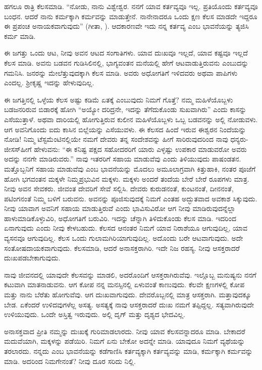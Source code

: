 ಹಗಲೂ ರಾತ್ರಿ ಕೆಲಸಮಾಡಿ. “ನೋಡು, ನಾನು ವಿಶ್ವೇಶ್ವರ. ನನಗೆ ಯಾವ ಕರ್ತವ್ಯವೂ ಇಲ್ಲ. ಪ್ರತಿಯೊಂದು ಕರ್ತವ್ಯವೂ ಬಂಧನ. ಆದರೆ ನಾನು ಕರ್ಮಕ್ಕಾಗಿ ಕರ್ಮವನ್ನು ಮಾಡುತ್ತೇನೆ. ನಾನೇನಾದರೂ ಒಂದು ಕ್ಷಣ ಕೆಲಸ ಮಾಡದೇ ಇದ್ದರೂ ಈ ಪ್ರಪಂಚ ಅನಾಯಕ\-ವಾಗುವುದು” (ಗೀತಾ, ). ಆದಕಾರಣವೇ ಇದು ನನ್ನ ಕರ್ತವ್ಯ ಎಂಬ ಭಾವನೆಯನ್ನು ತ್ಯಜಿಸಿ ಕರ್ಮ ಮಾಡಿ.

ಈ ಜಗತ್ತು ಒಂದು ಆಟ, ನೀವು ಅವನ ಆಟದ ಸಂಗಾತಿಗಳು. ಯಾವ ದುಃಖವೂ ಇಲ್ಲದೆ, ಯಾವ ಕಷ್ಟವೂ ಇಲ್ಲದೆ ಕೆಲಸ ಮಾಡಿ. ಅವನು ಬಡವನ ಗುಡಿಸಿಲಿನಲ್ಲಿ, ಭಾಗ್ಯವಂತನ ಮನೆಯಲ್ಲಿ ಹೇಗೆ ಆಟವಾಡುತ್ತಿರುವನು ಎಂಬುದನ್ನು ಗಮನಿಸಿ. ಜನರನ್ನು ಮೇಲೆತ್ತುವುದಕ್ಕಾಗಿ ಕೆಲಸ ಮಾಡಿ. ಅವರು ಅಧೋಗತಿಗೆ ಇಳಿದವರು ಅಥವಾ ಪಾಪಿಗಳು ಎಂದಲ್ಲ. ಶ‍್ರೀಕೃಷ್ಣ ಇದನ್ನು ಹೇಳುವುದಿಲ್ಲ.

ಈ ಜಗತ್ತಿನಲ್ಲಿ ಒಳ್ಳೆಯ ಕೆಲಸ ಅಷ್ಟು ಕಡಿಮೆ ಏತಕ್ಕೆ ಎಂಬುವುದು ನಿಮಗೆ ಗೊತ್ತೆ? ನಮ್ಮ ಮಹಿಳೆಯೊಬ್ಬಳು ಬಡಜನರಿರುವ ಬಿಡಾರಕ್ಕೆ ಹೋಗಿ “ಅಯ್ಯೋ ದರಿದ್ರನೇ, ಇದನ್ನು ತೆಗೆದುಕೊಂಡು ಸುಖವಾಗಿರು” ಎಂದು ಕಾಸನ್ನು ಎಸೆಯುತ್ತಾಳೆ. ಅಥವಾ ದಾರಿಯಲ್ಲಿ ಹೋಗುತ್ತಿರುವ ಕುಲೀನ ಮಹಿಳೆಯೊಬ್ಬಳು ಒಬ್ಬ ಬಡವನನ್ನು ಅಲ್ಲಿ ನೋಡುವಳು. ಆಗ ಅವನಿಗೊಂದು ಐದು ಕಾಸಿನ ಬಿಲ್ಲೆಯನ್ನು ಎಸೆಯುವಳು. ಈ ಕೆಲಸದ ಹಿಂದೆ ಇರುವ ಈಶ್ವರನ ನಿಂದೆಯನ್ನು ನೋಡಿ! ನಿಮ್ಮ ಟೆಸ್ಟಮೆಂಟಿನಲ್ಲಿಯೇ ನಮಗೆ ದೇವರು ತನ್ನ ಸಂದೇಶವನ್ನು ಹೀಗೆ ಸಾರಿರುವುದರಿಂದ ನಾವು ಧನ್ಯರು- ಜೀಸಸ್​ ಹೀಗೆ ಹೇಳುವನು: “ಈ ಕನಿಷ್ಟ ಪಕ್ಷದ ಸಹೋದರರಿಗೆ ಯಾರು ಎಳ್ಳಷ್ಟು ಉಪಕಾರ ಮಾಡುವರೋ ಅವರು ಅದನ್ನು ನನಗೇ ಮಾಡಿರುವರು.” ನಾವು ಇತರರಿಗೆ ಸಹಾಯ ಮಾಡುವೆವು ಎಂದು ತಿಳಿಯುವುದು ಪಾಷಂಡತನ. ಮತ್ತೊಬ್ಬನಿಗೆ ಸಹಾಯ ಮಾಡುವೆವು ಎಂಬ ಭಾವನೆಯನ್ನು ಮೊದಲು ಅಮೂಲಾಗ್ರವಾಗಿ ಕಿತ್ತುಹಾಕಿ, ನಂತರ ಪೂಜೆಗೆ ಹೋಗಿ ಭಗವಂತನ ಮಕ್ಕಳೇ ನಿಮ್ಮ\break ಪ್ರಭುವಿನ ಮಕ್ಕಳು. ಮಕ್ಕಳು ಅಂದರೆ ತಂದೆಯ ಬೇರೆ ಬೇರೆ ರೂಪಗಳು ಮಾತ್ರ. ನೀವು ಅವನ ಸೇವಕರು. ಜೀವಂತ ದೇವರಿಗೆ ಸೇವೆ ಸಲ್ಲಿಸಿ. ದೇವರು ಕುರುಡನಂತೆ, ಕುಂಟನಂತೆ, ದೀನನಂತೆ, ಪಟಿಂಗನಂತೆ ನಿಮ್ಮ ಬಳಿಗೆ ಬರುವನು. ಅವನನ್ನು ಪೂಜಿಸುವುದಕ್ಕೆ ನಿಮಗೆ ಎಂತಹ ಅದ್ಭುತವಾದ ಅವಕಾಶ ಸಿಕ್ಕುವುದು. ನೀವು ಯಾವಾಗ ಅವನಿಗೆ ಸಹಾಯ ಮಾಡುತ್ತಿರುವೆ ಎಂದು ಭಾವಿಸುವಿರೋ ಆಗ ನೀವು ಮಾಡಿರುವುದನ್ನೆಲ್ಲಾ ಹಾಳುಮಾಡಿಕೊಳ್ಳುವಿರಿ, ಅಧೋಗತಿಗೆ ಬರುವಿರಿ. ಇದನ್ನು ಚೆನ್ನಾಗಿ ತಿಳಿದುಕೊಂಡು ಕೆಲಸ ಮಾಡಿ. ಇದರಿಂದ ಏನಾಗುವುದು ಎಂದು ನೀವು ಕೇಳಬಹುದು. ಕೆಲಸದ ಆನಂತರ ನಿಮಗೆ ಯಾವ ನಿರಾಶೆಯೂ ಆಗುವುದಿಲ್ಲ, ಯಾವ ವ್ಯಸನವೂ ಆಗುವುದಿಲ್ಲ. ಕೆಲಸ ಒಂದು ಗುಲಾಮಗಿರಿಯಾಗುವುದಿಲ್ಲ. ಅದೊಂದು ಬರೇ ಆಟವಾಗುವುದು. ಅದೇ ಸಂತೋಷದಾಯಕವಾಗುವುದು. ಕೆಲಸಮಾಡಿ, ಆದರೆ ಅನಾಸಕ್ತರಾಗಿರಿ. ಇದೇ ನಿಜ ರಹಸ್ಯ. ನೀವು ಆಸಕ್ತರಾದರೆ ದುಃಖಪಡಬೇಕಾಗುವುದು.

ನಾವು ಜೀವನದಲ್ಲಿ ಯಾವುದೇ ಕೆಲಸವನ್ನು ಮಾಡಲಿ, ಅದರೊಂದಿಗೆ ಆಸಕ್ತರಾಗಿರು\-ವೆವು. ಇಲ್ಲೊಬ್ಬ ಮನುಷ್ಯನು ನನಗೆ ಕಟುವಾಗಿ ಮಾತನಾಡುವನು. ಆಗ ಕೋಪ ನನ್ನ ಮನಸ್ಸಿನಲ್ಲಿ ಏಳುವಂತೆ ಕಾಣುವುದು. ಕೆಲವೇ ಕ್ಷಣಗಳಲ್ಲಿ ಕೋಪ ಮತ್ತು ನಾನು ಬೆರೆತು ಹೋಗುವೆವು. ಆಗ ದುಃಖವಾಗುವುದು. ದೇವರೊಬ್ಬನಲ್ಲಿ ಮಾತ್ರ ಆಸಕ್ತರಾಗಿ. ಮತ್ತಾವು\-ದಕ್ಕೂ ಬೇಡ. ಏಕೆಂದರೆ ಉಳಿದವುಗಳೆಲ್ಲ ಅಸತ್ಯ. ಅಸತ್ಯಕ್ಕೆ ನಾವು ಆಸಕ್ತರಾದರೆ ದುಃಖ ನಮಗೆ ತಪ್ಪಿದ್ದಲ್ಲ. ಸತ್ಯವಾಗಿರುವುದೇ ಉಳಿಯುವುದು. ಒಂದೇ ಅಸ್ತಿತ್ವ ಇರುವುದು. ಅಲ್ಲಿ ದೃಗ್​ ಮತ್ತು ದೃಶ್ಯದ ಭೇದವಿಲ್ಲ.

ಅನಾಸಕ್ತವಾದ ಪ್ರೀತಿ ನಮ್ಮನ್ನು ದುಃಖಕ್ಕೆ ಗುರಿಮಾಡಲಾರದು. ನೀವು ಯಾವ ಕೆಲಸವನ್ನಾದರೂ ಮಾಡಿ. ಬೇಕಾದರೆ ಮದುವೆಯಾಗಿ, ಮಕ್ಕಳನ್ನು ಪಡೆಯಿರಿ. ನಿಮಗೆ ಏನು ಬೇಕೋ ಅದನ್ನೇ ಮಾಡಿ. ಯಾವುದೂ ನಿಮಗೆ ವ್ಯಥೆಯನ್ನು ತರಲಾರದು. ನನ್ನದು ಎಂಬ ಭಾವನೆಯನ್ನು ಕಡೆಗಾಣಿಸಿ ಕರ್ತವ್ಯಕ್ಕಾಗಿ ಕರ್ತವ್ಯವನ್ನು ಮಾಡಿ, ಕರ್ಮಕ್ಕಾಗಿ ಕರ್ಮವನ್ನು ಮಾಡಿ. ಅದರಿಂದ ನಿಮಗೇನಂತೆ? ನೀವು ದೂರ ಸರಿದು ನಿಲ್ಲಿ.

